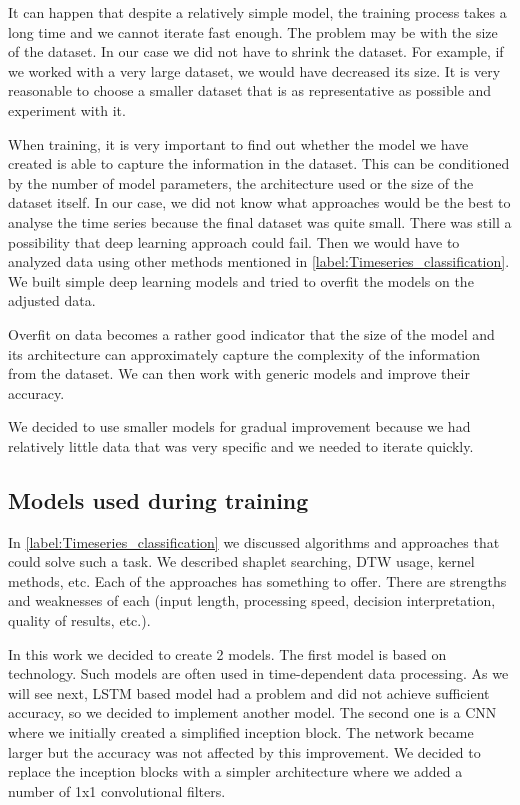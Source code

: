 \documentclass[thesis=M,english]{FITthesis}[2019/12/23]
\begin{document}
It can happen that despite a relatively simple model, the training process takes a long time and we cannot iterate fast enough. The problem may be with the size of the dataset. In our case we did not have to shrink the dataset. For example, if we worked with a very large dataset, we would have decreased its size. It is very reasonable to choose a smaller dataset that is as representative as possible and experiment with it.

When training, it is very important to find out whether the model we have created is able to capture the information in the dataset. This can be conditioned by the number of model parameters, the architecture used or the size of the dataset itself. In our case, we did not know what approaches would be the best to analyse the time series because the final dataset was quite small. There was still a possibility that deep learning approach could fail. Then we would have to analyzed data using other methods mentioned in \ref{label:Timeseries_classification}. We built simple deep learning models and tried to overfit the models on the adjusted data. 

Overfit on data becomes a rather good indicator that the size of the model and its architecture can approximately capture the complexity of the information from the dataset. We can then work with generic models and improve their accuracy.

We decided to use smaller models for gradual improvement because we had relatively little data that was very specific and we needed to iterate quickly.

\subsection{Models used during training}

In \ref{label:Timeseries_classification} we discussed algorithms and approaches that could solve such a task. We described shaplet searching, DTW usage, kernel methods, etc. Each of the approaches has something to offer. There are strengths and weaknesses of each (input length, processing speed, decision interpretation, quality of results, etc.).


In this work we decided to create 2 models. The first model is based on technology. Such models are often used in time-dependent data processing. As we will see next, LSTM based model had a problem and did not achieve sufficient accuracy, so we decided to implement another model. The second one is a CNN where we initially created a simplified inception block. The network became larger but the accuracy was not affected by this improvement. We decided to replace the inception blocks with a simpler architecture where we added a number of 1x1 convolutional filters.
\end{document}
